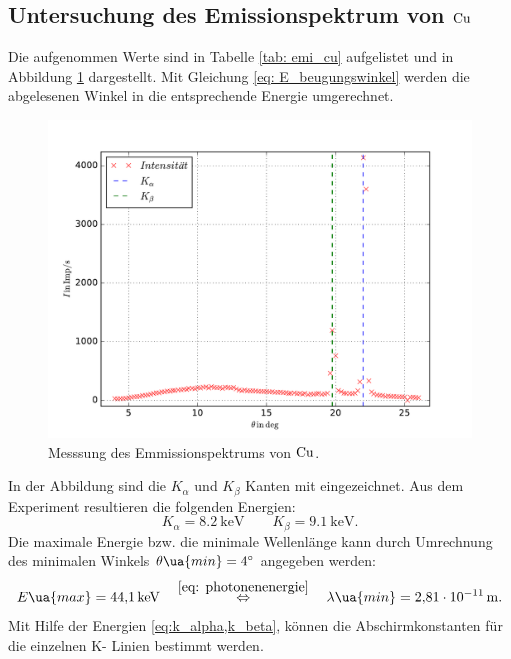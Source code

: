 \subsection{Untersuchung des Emissionspektrum von $\ce{Cu}$}
Die aufgenommen Werte sind in Tabelle \ref{tab: emi_cu} aufgelistet und in Abbildung \ref{fig: emission_cu} dargestellt.
Mit Gleichung \eqref{eq: E_beugungswinkel} werden die abgelesenen Winkel in die entsprechende Energie umgerechnet.

\begin{figure}
  \centering
  \includegraphics[width=1 \textwidth]{../Messdaten/emission_cu.pdf}
  \caption{Messsung des Emmissionspektrums von $\ce{Cu}$.}
  \label{fig: emission_cu}
\end{figure}
In der Abbildung sind die $K_\alpha$ und $K_\beta$ Kanten mit eingezeichnet. %
Aus dem Experiment resultieren die folgenden Energien:
\begin{equation}
  \label{eq:k_alpha,k_beta}
  K_\alpha=\SI{8.2}{\kilo\eV} \qquad   K_\beta=\SI{9.1}{\kilo\eV}.
\end{equation}
Die maximale Energie bzw. die minimale Wellenlänge kann durch Umrechnung des minimalen %
Winkels $\theta\ua{min}=\SI{4}{\degree}$ angegeben werden:
\begin{equation}
  \label{eq: maximale_energie}
  E\ua{max}=\SI{44.1}{\kilo\eV} \quad \overset{\eqref{eq: photonenenergie}}{\Leftrightarrow} \quad \lambda\ua{min}=\SI{2.81e-11}{\meter}.
\end{equation}
Mit Hilfe der Energien \eqref{eq:k_alpha,k_beta}, können die Abschirmkonstanten %
für die einzelnen K- Linien bestimmt werden. %
